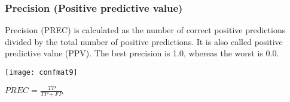 	
	

	
	






\begin{frame}[fragile]\frametitle{Precision (Positive predictive value)}
Precision (PREC) is calculated as the number of correct positive predictions divided
by the total number of positive predictions. It is also called positive predictive value
(PPV). The best precision is 1.0, whereas the worst is 0.0.

\begin{center}
\texttt{[image: confmat9]}
\end{center}

$PREC = \frac{TP}{TP+FP}$
\end{frame}

